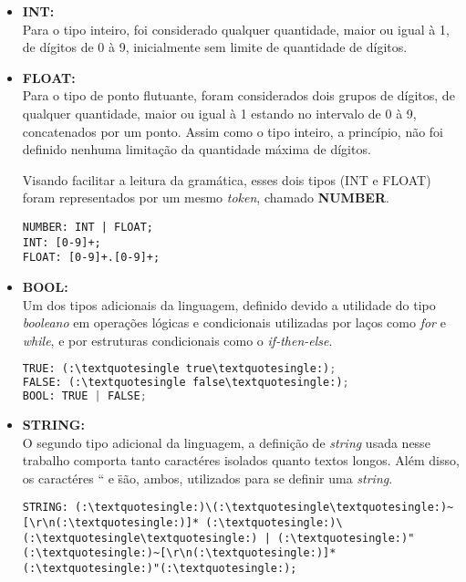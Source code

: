             \begin{itemize}
                \item \textbf{INT:}\\
                    Para o tipo inteiro, foi considerado qualquer quantidade, maior ou igual à 1, de dígitos de 0 à 9, inicialmente sem limite de quantidade de dígitos.

                \item \textbf{FLOAT:}\\
                    Para o tipo de ponto flutuante, foram considerados dois grupos de dígitos, de qualquer quantidade, maior ou igual à 1 estando no intervalo de 0 à 9, concatenados por um ponto. Assim como o tipo inteiro, a princípio, não foi definido nenhuma limitação da quantidade máxima de dígitos.

                    Visando facilitar a leitura da gramática, esses dois tipos (INT e FLOAT) foram representados por um mesmo \textit{token}, chamado \textbf{NUMBER}.

                    \begin{lstlisting}
NUMBER: INT | FLOAT;
INT: [0-9]+;
FLOAT: [0-9]+.[0-9]+;
                    \end{lstlisting}

                \item \textbf{BOOL:}\\
                    Um dos tipos adicionais da linguagem, definido devido a utilidade do tipo \textit{booleano} em operações lógicas e condicionais utilizadas por laços como \textit{for} e \textit{while}, e por estruturas condicionais como o \textit{if-then-else}.

                    \begin{lstlisting}[language=python]
TRUE: (:\textquotesingle true\textquotesingle:);
FALSE: (:\textquotesingle false\textquotesingle:);
BOOL: TRUE | FALSE;
                    \end{lstlisting}

                \item \textbf{STRING:}\\
                    O segundo tipo adicional da linguagem, a definição de \textit{string} usada nesse trabalho comporta tanto caractéres isolados quanto textos longos. Além disso, os caractéres `` e \" são, ambos, utilizados para se definir uma \textit{string}.

                    \begin{lstlisting}
STRING: (:\textquotesingle:)\(:\textquotesingle\textquotesingle:)~[\r\n(:\textquotesingle:)]* (:\textquotesingle:)\(:\textquotesingle\textquotesingle:) | (:\textquotesingle:)"(:\textquotesingle:)~[\r\n(:\textquotesingle:)]*(:\textquotesingle:)"(:\textquotesingle:);
                    \end{lstlisting}
            \end{itemize}



